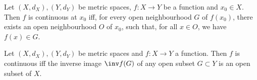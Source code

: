 \documentclass{article}
\begin{document}
\begin{proposition}[Notes 6.2]
    Let $(X,d_X),(Y,d_Y)$ be metric spaces, $f:X\to Y$ be a function and $x_0\in X$. Then $f$ is continuous
    at $x_0$ iff, for every open neighbourhood $G$ of $f(x_0)$, there exists an open neighbourhood $O$ of
    $x_0$, such that, for all $x\in O$, we have $f(x)\in G$.
\end{proposition}

\begin{theorem}[Notes 6.5]
    Let $(X,d_X),(Y,d_Y)$ be metric spaces and $f:X\to Y$ a function. Then $f$ is continuous iff 
    the inverse image $\inv f(G)$ of any open subset $G\subset Y$ is an open subset of $X$.
\end{theorem}
\end{document}
